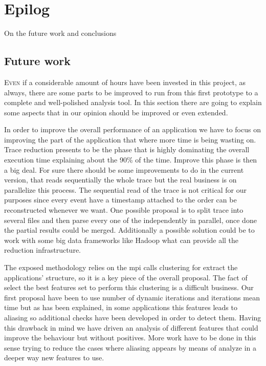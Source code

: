 \chapter{Epilog}

On the future work and conclusions

\section{Future work}

\lettrine{E}{ven} if a considerable amount of hours have been invested in this project, as 
always, there are some parts to be improved to run from this first prototype to
a complete and well-polished analysis tool. In this section there are going to
explain some aspects that in our opinion should be improved or even extended.


In order to improve the 
overall performance of an application we have to focus on improving the part of
the application that where more time is being wasting on. Trace reduction presents
to be the phase that is highly dominating the overall execution time explaining 
about the 90\% of the time. Improve this phase is then a big deal. For sure
there should be some improvements to do in the current version, that reads
sequentially the whole trace but the real business is on parallelize this
process. The sequential read of the trace is not critical for our purposes since
every event have a timestamp attached to the order can be reconstructed whenever
we want. One possible proposal is to split trace into several files and then
parse every one of the independently in parallel, once done the partial results 
could be merged. Additionally a possible solution could be to work with some
big data frameworks like Hadoop what can provide all the reduction
infrastructure.

The exposed methodology relies on the mpi calls clustering for extract the
applications' structure, so it is a key piece of the overall proposal. The fact
of select the best features set to perform this clustering is a difficult
business. Our first proposal have been to use number of dynamic iterations and
iterations mean time but as has been explained, in some applications this
features leads to aliasing so additional checks have been developed in order to
detect them. Having this drawback in mind we have driven an analysis of different
features that could improve the behaviour but without positives. More work have 
to be done in this sense trying to reduce the cases where aliasing appears by
means of analyze in a deeper way new features to use.

